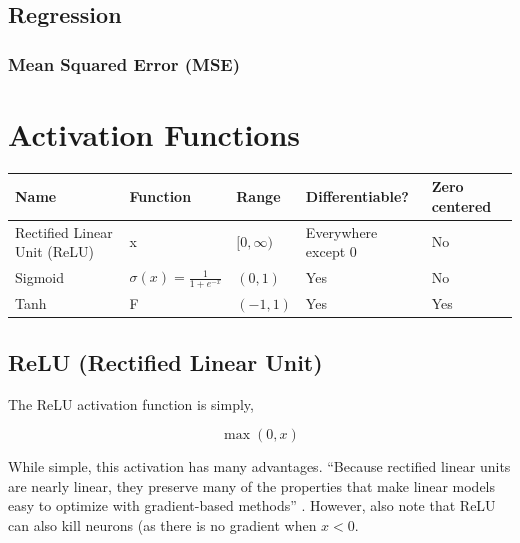 \documentclass{article}
\begin{document}
\subsection{Regression}

\subsubsection{Mean Squared Error (MSE)}
\section{Activation Functions}


\begin{center}
\begin{tabular}{ l l l l l }
 \hline
 Name & Function & Range & Differentiable? & Zero centered \\
 \hline
Rectified Linear Unit (ReLU)    & 
x
                                                                    & $ [0, \infty) $   & Everywhere except 0   & No \\
 Sigmoid                        & $\sigma(x) = \frac{1}{1+e^{-x}}$  & $ (0, 1) $        & Yes                   & No \\
 Tanh                           & F                                 & $ (-1, 1) $       & Yes                   & Yes \\
 \hline
\end{tabular}
\end{center}



\subsection{ReLU (Rectified Linear Unit)}

The ReLU activation function is simply,

\begin{equation}
    \max(0, x)
\end{equation}

\noindent
While simple, this activation has many advantages. ``Because rectified linear units are nearly linear, they preserve many of the properties that make linear models easy to optimize with gradient-based methods'' \citet[pg.~169]{Goodfellow2016}.
However, also note that ReLU can also kill neurons (as there is no gradient when $x < 0$.
\end{document}
